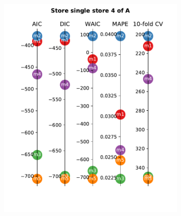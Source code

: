\documentclass[english, 12pt, a4paper, sci, utf8, a-1b, online]{aaltothesis}
\begin{document}
\begin{figure}[hbt]
	\begin{subfigure}[htb]{0.3\textwidth}
		\centering
		\includegraphics[width=\textwidth]{../plots/metrics/metrics_plot_single_store_4_of_A.pdf}
	\end{subfigure}
	\hfill
	\begin{subfigure}[htb]{0.3\textwidth}
		\centering

\end{subfigure}
\end{figure}
\end{document}
